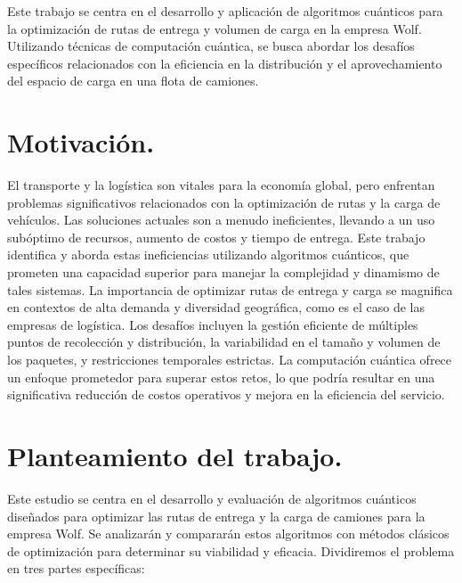\documentclass[11pt,a4paper,spanish]{book}
\begin{document}
Este trabajo se centra en el desarrollo y aplicación de algoritmos cuánticos para la optimización de rutas de entrega y volumen de carga en la empresa Wolf. Utilizando técnicas de computación cuántica, se busca abordar los desafíos específicos relacionados con la eficiencia en la distribución y el aprovechamiento del espacio de carga en una flota de camiones. 


\section{Motivación.}

    El transporte y la logística son vitales para la economía global, pero enfrentan problemas significativos relacionados con la optimización de rutas y la carga de vehículos. Las soluciones actuales son a menudo ineficientes, llevando a un uso subóptimo de recursos, aumento de costos y tiempo de entrega. Este trabajo identifica y aborda estas ineficiencias utilizando algoritmos cuánticos, que prometen una capacidad superior para manejar la complejidad y dinamismo de tales sistemas.
    La importancia de optimizar rutas de entrega y carga se magnifica en contextos de alta demanda y diversidad geográfica, como es el caso de las empresas de logística. Los desafíos incluyen la gestión eficiente de múltiples puntos de recolección y distribución, la variabilidad en el tamaño y volumen de los paquetes, y restricciones temporales estrictas. La computación cuántica ofrece un enfoque prometedor para superar estos retos, lo que podría resultar en una significativa reducción de costos operativos y mejora en la eficiencia del servicio.

\section{Planteamiento del trabajo.}

    Este estudio se centra en el desarrollo y evaluación de algoritmos cuánticos diseñados para optimizar las rutas de entrega y la carga de camiones para la empresa Wolf. Se analizarán y compararán estos algoritmos con métodos clásicos de optimización para determinar su viabilidad y eficacia. Dividiremos el problema en tres partes específicas:
\end{document}
